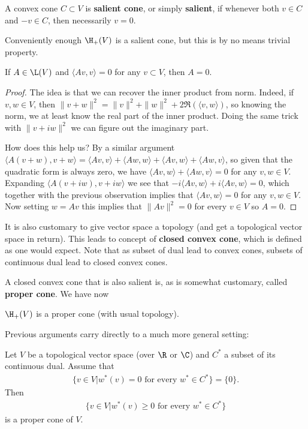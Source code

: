 \begin{maar}
	A convex cone $C \subset V$ is \textbf{salient cone}, or simply \textbf{salient}, if whenever both $v \in C$ and $-v \in C$, then necessarily $v = 0$.
\end{maar}

Conveniently enough $\H_{+}(V)$ is a salient cone, but this is by no means trivial property.

\begin{lem}\label{inj_compr}
	If $A \in \L(V)$ and $\langle A v, v \rangle = 0$ for any $v \subset V$, then $A = 0$.
\end{lem} 
\begin{proof}
	The idea is that we can recover the inner product from norm. Indeed, if $v, w \in V$, then $\|v + w\|^2 = \|v\|^2 + \|w\|^2 + 2 \Re(\langle v, w \rangle)$, so knowing the norm, we at least know the real part of the inner product. Doing the same trick with $\|v + i w\|^2$ we can figure out the imaginary part.

	How does this help us? By a similar argument $\langle A(v + w), v + w \rangle = \langle A v, v \rangle + \langle A w, w \rangle + \langle A v, w\rangle + \langle A w, v \rangle$, so given that the quadratic form is always zero, we have $\langle A v, w \rangle + \langle A w, v \rangle = 0$ for any $v, w \in V$. Expanding $\langle A (v + i w), v + i w \rangle$ we see that $-i \langle A v, w \rangle + i \langle A v, w \rangle = 0$, which together with the previous observation implies that $\langle A v , w \rangle = 0$ for any $v, w \in V$. Now setting $w = A v$ this implies that $\|A v\|^{2} = 0$ for every $v \in V$ so $A = 0$.
\end{proof}

It is also customary to give vector space a topology (and get a topological vector space in return). This leads to concept of \textbf{closed convex cone}, which is defined as one would expect. Note that as subset of dual lead to convex cones, subsets of continuous dual lead to closed convex cones.

A closed convex cone that is also salient is, as is somewhat customary, called \textbf{proper cone}. We have now

\begin{lause}\label{basic_positive}
	$\H_{+}(V)$ is a proper cone (with usual topology).
\end{lause}

Previous arguments carry directly to a much more general setting:

\begin{lause}\label{positive_machine}
	Let $V$ be a topological vector space (over $\R$ or $\C$) and $C^{*}$ a subset of its continuous dual. Assume that
	\begin{align*}
		\{v \in V | w^{*}(v) = 0 \text{ for every $w^{*} \in C^{*}$} \} = \{0\}.
	\end{align*}
	Then
	\begin{align*}
		\{v \in V | w^{*}(v) \geq 0 \text{ for every $w^{*} \in C^{*}$}\}
	\end{align*}
	is a proper cone of $V$.
\end{lause}

